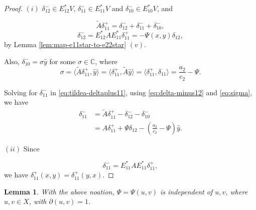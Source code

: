 \documentclass[
]{book}
\newtheorem{lemma}{Lemma}[chapter]
\theoremstyle{definition}
\theoremstyle{definition}
\theoremstyle{definition}
\theoremstyle{definition}
\theoremstyle{remark}
\begin{document}
\begin{proof}
\leavevmode

\((i)\) \(\delta^-_{12}\in E^*_{12}V\), \(\delta^-_{11}\in E^*_{11}V\) and \(\delta^-_{10}\in E^*_{10}V\), and

\begin{equation}
\tilde{A}\delta^+_{11} = \delta^-_{12} + \delta^-_{11} + \delta^-_{10}, \label{eq:tildea-deltaplus11}
\end{equation}
\begin{equation}
\delta^-_{12} = E^*_{12}AE^*_{11}\delta^+_{11} = -\Psi(x,y)\delta_{12} \label{eq:delta-minus12},
\end{equation}
by Lemma \ref{lem:map-e11star-to-e22star} \((v)\).

Also, \(\delta^-_{10} = \sigma\hat{y}\) for some \(\sigma\in \mathbb{C}\), where
\begin{equation}
\sigma  = \langle \tilde{A}\delta^+_{11}, \hat{y}\rangle 
 = \langle \delta^+_{11}, \tilde{A}\hat{y}\rangle
 = \langle \delta^+_{11}, \delta_{11}\rangle 
 = \frac{a_2}{c_2}-\Psi. \label{eq:sigma}
\end{equation}

Solving for \(\delta^-_{11}\) in \eqref{eq:tildea-deltaplus11}, using \eqref{eq:delta-minus12} and \eqref{eq:sigma}, we have
\begin{align}
\delta^-_{11} & = \tilde{A}\delta^+_{11} - \delta^-_{12} - \delta^-_{10}\\
& = A\delta^+_{11} + \Psi \delta_{12} - \left(\frac{a_2}{c_2} - \Psi\right)\hat{y}.
\end{align}

\((ii)\) Since

\[\delta^-_{11} = E^*_{11}AE^*_{11}\delta^+_{11},\]
we have \(\delta^+_{11}(x,y) = \delta^+_{11}(y,x)\).

\end{proof}

\begin{lemma}
\protect\hypertarget{lem:psi}{}\label{lem:psi}With the above noation, \(\Psi = \Psi(u,v)\) is independent of \(u, v\), where
\(u,v\in X\), with \(\partial(u,v)=1\).
\end{lemma}
\end{document}
